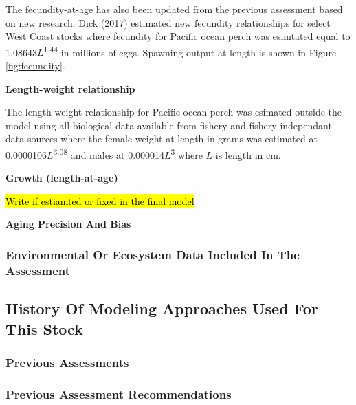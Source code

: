 \documentclass[12pt,]{article}
\begin{document}
The fecundity-at-age has also been updated from the previous assessment
based on new research. Dick
(\protect\hyperlink{ref-dick_meta-analysis_2017}{2017}) estimated new
fecundity relationships for select West Coast stocks where fecundity for
Pacific ocean perch was esimtated equal to
1.08643\(L\)\textsuperscript{1.44} in millions of eggs. Spawning output
at length is shown in Figure \ref{fig:fecundity}.

\vspace{.5cm}

\textbf{Length-weight relationship}

The length-weight relationship for Pacific ocean perch was esimated
outside the model using all biological data available from fishery and
fishery-independant data sources where the female weight-at-length in
grams was estimated at 0.0000106\(L\)\textsuperscript{3.08} and males at
0.000014\(L\)\textsuperscript{3} where \(L\) is length in cm.

\vspace{.5cm}

\textbf{Growth (length-at-age)}

\hl{Write if estiamted or fixed in the final model}

\vspace{.5cm} \textbf{Aging Precision And Bias}

\subsubsection{Environmental Or Ecosystem Data Included In The
Assessment}\label{environmental-or-ecosystem-data-included-in-the-assessment}

\subsection{History Of Modeling Approaches Used For This
Stock}\label{history-of-modeling-approaches-used-for-this-stock}

\subsubsection{Previous Assessments}\label{previous-assessments}

\subsubsection{Previous Assessment
Recommendations}\label{previous-assessment-recommendations}
\end{document}
